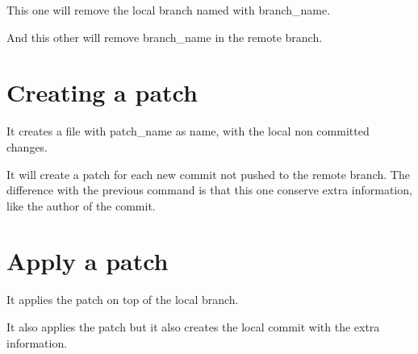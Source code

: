\noindent{}

This one will remove the local branch named with branch\_name.

\noindent{}

And this other will remove branch\_name in the remote branch.

\section*{Creating a patch}

\noindent{}

It creates a file with patch\_name as name, with the local non committed changes.

\noindent{}

It will create a patch for each new commit not pushed to the remote branch. The difference with the previous command is that this one conserve extra information, like the author of the commit.

\newpage
\section*{Apply a patch}

\noindent{}

It applies the patch on top of the local branch.

\noindent{}

It also applies the patch but it also creates the local commit with the extra information.
